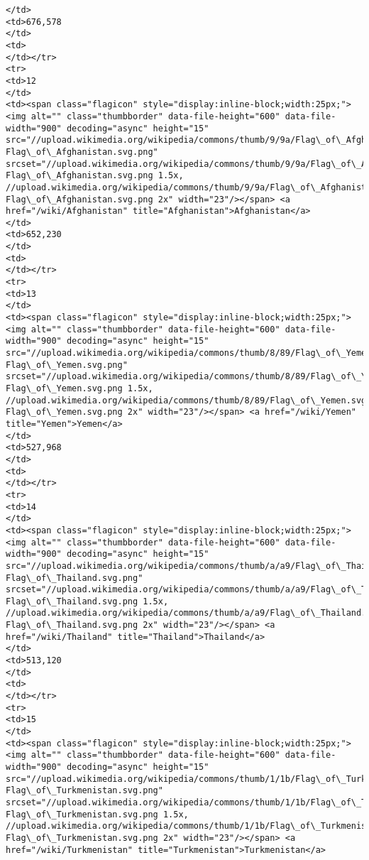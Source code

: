 \documentclass[11pt]{article}
\begin{document}
\begin{Verbatim}[commandchars=\\\{\}]
</td>
<td>676,578
</td>
<td>
</td></tr>
<tr>
<td>12
</td>
<td><span class="flagicon" style="display:inline-block;width:25px;"><img alt="" class="thumbborder" data-file-height="600" data-file-width="900" decoding="async" height="15" src="//upload.wikimedia.org/wikipedia/commons/thumb/9/9a/Flag\_of\_Afghanistan.svg/23px-Flag\_of\_Afghanistan.svg.png" srcset="//upload.wikimedia.org/wikipedia/commons/thumb/9/9a/Flag\_of\_Afghanistan.svg/35px-Flag\_of\_Afghanistan.svg.png 1.5x, //upload.wikimedia.org/wikipedia/commons/thumb/9/9a/Flag\_of\_Afghanistan.svg/45px-Flag\_of\_Afghanistan.svg.png 2x" width="23"/></span> <a href="/wiki/Afghanistan" title="Afghanistan">Afghanistan</a>
</td>
<td>652,230
</td>
<td>
</td></tr>
<tr>
<td>13
</td>
<td><span class="flagicon" style="display:inline-block;width:25px;"><img alt="" class="thumbborder" data-file-height="600" data-file-width="900" decoding="async" height="15" src="//upload.wikimedia.org/wikipedia/commons/thumb/8/89/Flag\_of\_Yemen.svg/23px-Flag\_of\_Yemen.svg.png" srcset="//upload.wikimedia.org/wikipedia/commons/thumb/8/89/Flag\_of\_Yemen.svg/35px-Flag\_of\_Yemen.svg.png 1.5x, //upload.wikimedia.org/wikipedia/commons/thumb/8/89/Flag\_of\_Yemen.svg/45px-Flag\_of\_Yemen.svg.png 2x" width="23"/></span> <a href="/wiki/Yemen" title="Yemen">Yemen</a>
</td>
<td>527,968
</td>
<td>
</td></tr>
<tr>
<td>14
</td>
<td><span class="flagicon" style="display:inline-block;width:25px;"><img alt="" class="thumbborder" data-file-height="600" data-file-width="900" decoding="async" height="15" src="//upload.wikimedia.org/wikipedia/commons/thumb/a/a9/Flag\_of\_Thailand.svg/23px-Flag\_of\_Thailand.svg.png" srcset="//upload.wikimedia.org/wikipedia/commons/thumb/a/a9/Flag\_of\_Thailand.svg/35px-Flag\_of\_Thailand.svg.png 1.5x, //upload.wikimedia.org/wikipedia/commons/thumb/a/a9/Flag\_of\_Thailand.svg/45px-Flag\_of\_Thailand.svg.png 2x" width="23"/></span> <a href="/wiki/Thailand" title="Thailand">Thailand</a>
</td>
<td>513,120
</td>
<td>
</td></tr>
<tr>
<td>15
</td>
<td><span class="flagicon" style="display:inline-block;width:25px;"><img alt="" class="thumbborder" data-file-height="600" data-file-width="900" decoding="async" height="15" src="//upload.wikimedia.org/wikipedia/commons/thumb/1/1b/Flag\_of\_Turkmenistan.svg/23px-Flag\_of\_Turkmenistan.svg.png" srcset="//upload.wikimedia.org/wikipedia/commons/thumb/1/1b/Flag\_of\_Turkmenistan.svg/35px-Flag\_of\_Turkmenistan.svg.png 1.5x, //upload.wikimedia.org/wikipedia/commons/thumb/1/1b/Flag\_of\_Turkmenistan.svg/45px-Flag\_of\_Turkmenistan.svg.png 2x" width="23"/></span> <a href="/wiki/Turkmenistan" title="Turkmenistan">Turkmenistan</a>

\end{Verbatim}
\end{document}
